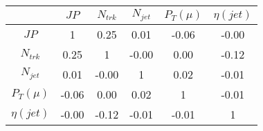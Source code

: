 \begin{tabular}{|c|c|c|c|c|c|} 
\hline
 & $JP$ & $N_{trk}$ & $N_{jet}$ & $P_{T} (\mu)$ & $\eta (jet)$ \\ \hline
$JP$ & 1 & 0.25 & 0.01 & -0.06 & -0.00 \\
$N_{trk}$ & 0.25 & 1 & -0.00 & 0.00 & -0.12 \\
$N_{jet}$ & 0.01 & -0.00 & 1 & 0.02 & -0.01 \\
$P_{T} (\mu)$ & -0.06 & 0.00 & 0.02 & 1 & -0.01 \\
$\eta (jet)$ & -0.00 & -0.12 & -0.01 & -0.01 & 1 \\
\hline 
\end{tabular} 



